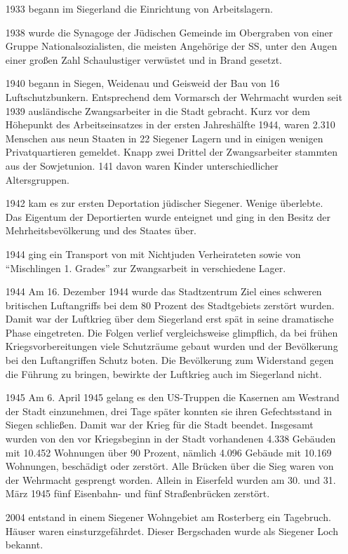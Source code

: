 \documentclass[paper=a4, fontsize=11pt]{scrartcl} %
\numberwithin{equation}{section}		%
\numberwithin{figure}{section}			%
\numberwithin{table}{section}			%
\begin{document}
\begin{itemize}
 	\item [1933] begann im Siegerland die Einrichtung von Arbeitslagern.
 	\item [1938] wurde die Synagoge der Jüdischen Gemeinde im Obergraben von einer Gruppe Nationalsozialisten, die meisten Angehörige der SS, unter den Augen einer großen Zahl Schaulustiger verwüstet und in Brand gesetzt. 
 	\item [1940] begann in Siegen, Weidenau und Geisweid der Bau von 16 Luftschutzbunkern. Entsprechend dem Vormarsch der Wehrmacht wurden seit 1939 ausländische Zwangsarbeiter in die Stadt gebracht. Kurz vor dem Höhepunkt des Arbeitseinsatzes in der ersten Jahreshälfte 1944, waren 2.310 Menschen aus neun Staaten in 22 Siegener Lagern und in einigen wenigen Privatquartieren gemeldet. Knapp zwei Drittel der Zwangsarbeiter stammten aus der Sowjetunion. 141 davon waren Kinder unterschiedlicher Altersgruppen.
 	\item [1942] kam es zur ersten Deportation jüdischer Siegener. Wenige überlebte. Das Eigentum der Deportierten wurde enteignet und ging in den Besitz der Mehrheitsbevölkerung und des Staates über.
 	\item [1944] ging ein Transport von mit Nichtjuden Verheirateten sowie von \enquote{Mischlingen 1. Grades} zur Zwangsarbeit in verschiedene Lager.
 	\item [1944] Am 16. Dezember 1944 wurde das Stadtzentrum Ziel eines schweren britischen Luftangriffs bei dem 80 Prozent des Stadtgebiets zerstört wurden. Damit war der Luftkrieg über dem Siegerland erst spät in seine dramatische Phase eingetreten. Die Folgen verlief vergleichsweise glimpflich, da bei frühen Kriegsvorbereitungen viele Schutzräume gebaut wurden und der Bevölkerung bei den Luftangriffen Schutz boten. Die Bevölkerung zum Widerstand gegen die Führung zu bringen, bewirkte der Luftkrieg auch im Siegerland nicht.
 	\item [1945] Am 6. April 1945 gelang es den US-Truppen die Kasernen am Westrand der Stadt einzunehmen, drei Tage später konnten sie ihren Gefechtsstand in Siegen schließen. Damit war der Krieg für die Stadt beendet. Insgesamt wurden von den vor Kriegsbeginn in der Stadt vorhandenen 4.338 Gebäuden mit 10.452 Wohnungen über 90 Prozent, nämlich 4.096 Gebäude mit 10.169 Wohnungen, beschädigt oder zerstört. Alle Brücken über die Sieg waren von der Wehrmacht gesprengt worden. Allein in Eiserfeld wurden am 30. und 31. März 1945 fünf Eisenbahn- und fünf Straßenbrücken zerstört.
 	\item [2004] entstand in einem Siegener Wohngebiet am Rosterberg ein Tagebruch. Häuser waren einsturzgefährdet. Dieser Bergschaden wurde als Siegener Loch bekannt.
 \end{itemize}
 
\end{document}
